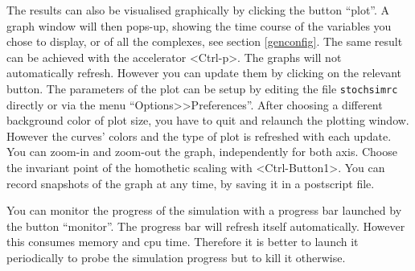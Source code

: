  The results can also be
visualised graphically by clicking the button ``plot''. A graph window will then
pops-up, showing the time course of the variables you chose to display, or of
all the complexes, see section \ref{genconfig}. The same result can be achieved
with the accelerator <Ctrl-p>. The graphs will not automatically refresh.
However you can update them by clicking on the relevant button. The parameters
of the plot can be setup by editing the file \texttt{stochsimrc} directly or via
the menu ``Options>>Preferences''. After choosing a different background color
of plot size, you have to quit and relaunch the plotting window. However the
curves' colors and the type of plot is refreshed with each update. You can
zoom-in and zoom-out the graph, independently for both axis. Choose the
invariant point of the homothetic scaling with <Ctrl-Button1>. You can record
snapshots of the graph at any time, by saving it in a postscript file.

You can monitor the progress of the simulation with a progress bar
launched by the button ``monitor''. The progress bar will refresh itself
automatically. However this consumes memory and cpu time. Therefore it is better
to launch it periodically to probe the simulation progress but to kill it
otherwise.

